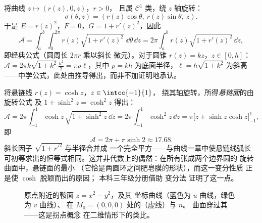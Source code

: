 \begin{example}[旋转曲面]\label{ex:b2:surfaces:revolution}
将曲线 $z \mapsto (r(z), 0, z)$，$r > 0$，
且属 $\mathcal{C}^1$ 类，绕 $z$ 轴旋转：
\[
\sigma(\theta, z) = (r(z)\cos\theta,\ r(z)\sin\theta,\ z).
\]
于是 $E = r(z)^2$，$F = 0$，$G = 1 + r'(z)^2$，因此
\[
\mathcal{A} = \int_a^b\!\!\int_0^{2\pi}
r(z)\sqrt{1 + r'(z)^2}\;\dd\theta\,\dd z
= 2\pi\int_a^b r(z)\sqrt{1 + r'(z)^2}\,\dd z ,
\]
即经典公式（圆周长 $2\pi r$ 乘以斜长
微元）。对于圆锥 $r(z) = kz$，$z \in [0, h]$：$\mathcal
A = 2\pi k\sqrt{1 + k^2}\,\frac{h^2}{2} = \pi \rho \ell$，其中
$\rho = kh$ 为底面半径，$\ell = h\sqrt{1 + k^2}$ 为斜高
——中学公式，此处由推导得出，而非不加证明地承认。
\end{example}

\begin{example}[悬链面]\label{ex:b2:surfaces:catenoid}
将悬链线 $r(z) = \cosh z$，$z \in \intcc{-1}{1}$，
绕其轴旋转，所得\emph{悬链面}的由旋转公式
及 $1 + \sinh^2 z = \cosh^2 z$ 得出：
\[
\mathcal A = 2\pi\int_{-1}^1\cosh z\,\sqrt{1 + \sinh^2z}\,
\dd z = 2\pi\int_{-1}^1\cosh^2z\,\dd z
= \pi\bigl[z + \sinh z\cosh z\bigr]_{-1}^{1},
\]
即
\[
\mathcal A = 2\pi + \pi\sinh 2 \approx 17.68 .
\]
斜长因子 $\sqrt{1 + r'^2}$ 与半径合并成
一个完全平方——与曲线一章中使悬链线弧长
可初等求出的恒等式相同。这并非代数上的偶然：在所有张成两个边界圆的
旋转曲面中，悬链面的最小
（它恰是两圆环之间肥皂膜的形状），而这一变分性质
正是使 $\cosh$ 脱颖而出的原因；
本科三年级分册借助
变分法
证明了这一点。
\end{example}

\begin{figure}[ht]
\centering
{}
\caption{原点附近的鞍面 $z = x^2 - y^2$，及其
坐标曲线（蓝色为 $u$ 曲线，绿色为 $v$ 曲线）、
在 $M_0 = (0,0,0)$ 处的（虚线）与 $n$。
曲面穿过其——这是拐点概念
在二维情形下的类比。}
\label{fig:b2:surfaces:saddle}
\end{figure}

